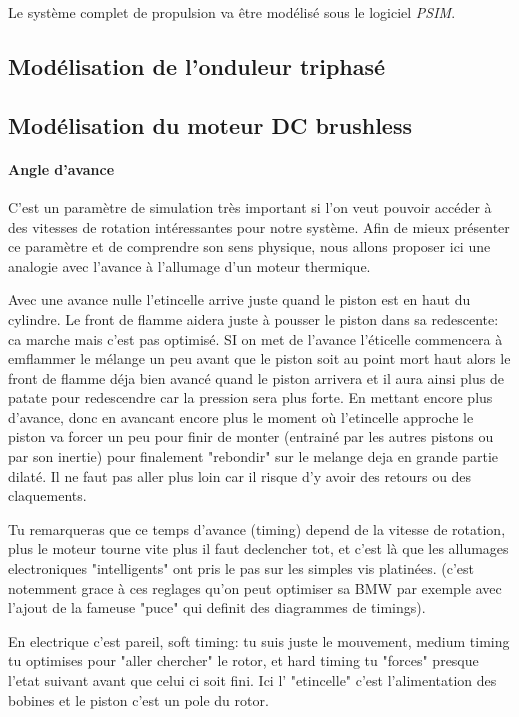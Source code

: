 		Le système complet de propulsion va être modélisé sous le logiciel \textit{PSIM}.
			
			\subsection{Modélisation de l'onduleur triphasé} 
				
			\subsection{Modélisation du moteur DC brushless}
				
					\paragraph{Angle d'avance}
					C'est un paramètre de simulation très important si l'on veut pouvoir accéder à des vitesses de rotation intéressantes pour notre système. Afin de mieux présenter ce paramètre et de comprendre son sens physique, nous allons proposer ici une analogie avec l'avance à l'allumage d'un moteur thermique.
					
					Avec une avance nulle l'etincelle arrive juste quand le piston est en haut du cylindre. Le front de flamme aidera juste à pousser le piston dans sa redescente: ca marche mais c'est pas optimisé. SI on met de l'avance l'éticelle commencera à emflammer le mélange un peu avant que le piston soit au point mort haut alors le front de flamme déja bien avancé quand le piston arrivera et il aura ainsi plus de patate pour redescendre car la pression sera plus forte.
En mettant encore plus d'avance, donc en avancant encore plus le moment où l'etincelle approche le piston va forcer un peu pour finir de monter (entrainé par les autres pistons ou par son inertie) pour finalement "rebondir" sur le melange deja en grande partie dilaté. Il ne faut pas aller plus loin car il risque d'y avoir des retours ou des claquements.


Tu remarqueras que ce temps d'avance (timing) depend de la vitesse de rotation, plus le moteur tourne vite plus il faut declencher tot, et c'est là que les allumages electroniques "intelligents" ont pris le pas sur les simples vis platinées. (c'est notemment grace à ces reglages qu'on peut optimiser sa BMW par exemple avec l'ajout de la fameuse "puce" qui definit des diagrammes de timings).

En electrique c'est pareil, soft timing: tu suis juste le mouvement, medium timing tu optimises pour "aller chercher" le rotor, et hard timing tu "forces" presque l'etat suivant avant que celui ci soit fini.
Ici l' "etincelle" c'est l'alimentation des bobines et le piston c'est un pole du rotor.


